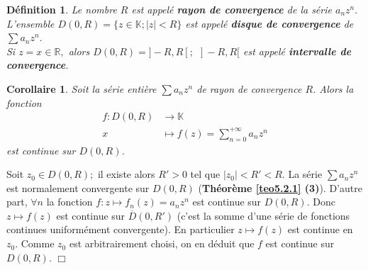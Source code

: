 \documentclass[11pt, a4paper]{book}
\newtheorem{defi}{D\'efinition}[section]
\newtheorem{cor}{Corollaire}[section]
\newenvironment{pr}{\noindent {\bf Preuve} \noindent} {\hfill $\Box$\vskip 5mm}
\begin{document}
\begin{defi}
Le nombre $R$ est appel\'e \textbf{rayon de convergence } de la s\'erie $a_n z^n.$\\
L'ensemble $D(0,R)=\{z\in \mathbb{K};|z|<R\}$ est appel\'e \textbf{disque de convergence} de $\sum a_nz^n.$ \\
Si $z=x\in \mathbb{R},$ alors $D(0,R)=]-R,R[;~~]-R,R[$ est appel\'e \textbf{intervalle de convergence}.
\end{defi}
\begin{cor} \label{cor5.2.1} Soit la s\'erie enti\`ere $\sum a_nz^n$ de rayon de convergence $R$. Alors la fonction 
\begin{align*}
f:D(0,R)&\longrightarrow\mathbb{K}\\ x&\longmapsto f(z)=\sum_{n=0}^{+\infty} a_nz^n
\end{align*} est continue sur $D(0,R)$.
\end{cor}
\begin{pr}\quad
Soit $z_0\in D(0,R);$ il existe alors $R'>0$ tel que $|z_0|<R'<R.$ La s\'erie $\sum a_nz^n$ est normalement convergente sur $D(0,R)$ (\textbf{Th\'eor\`eme \ref{teo5.2.1} (3)}). D'autre part, $\forall n$ la fonction $f:z\mapsto f_n(z)=a_n z^n$ est continue sur $D(0,R)$. Donc $z\mapsto f(z)$ est continue sur $\overline{D}(0,R')$ (c'est la somme d'une s\'erie de fonctions continues uniform\'ement convergente). En particulier $z\mapsto f(z)$ est continue en $z_0$. Comme $z_0$ est arbitrairement choisi, on en d\'eduit que $f$ est continue sur $D(0,R).$
\end{pr}
\end{document}
